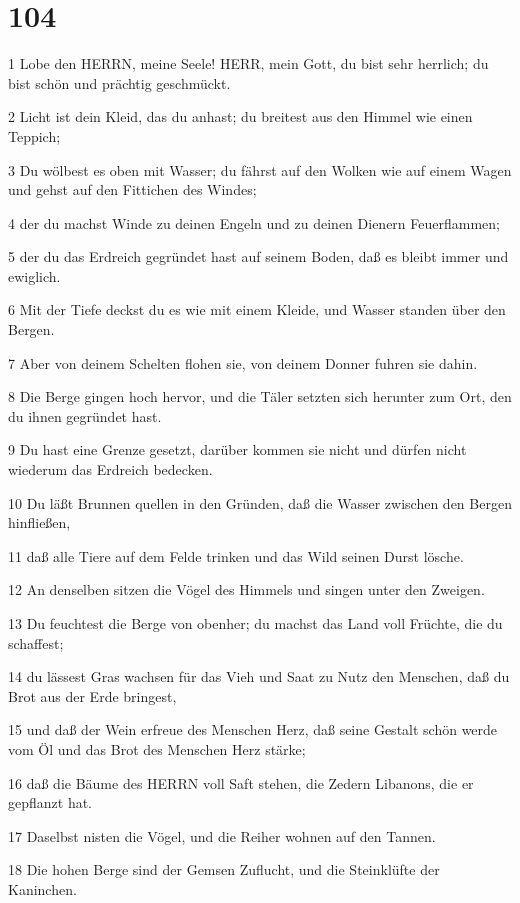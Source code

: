 \chapter{104}

\par 1 Lobe den HERRN, meine Seele! HERR, mein Gott, du bist sehr herrlich; du bist schön und prächtig geschmückt.
\par 2 Licht ist dein Kleid, das du anhast; du breitest aus den Himmel wie einen Teppich;
\par 3 Du wölbest es oben mit Wasser; du fährst auf den Wolken wie auf einem Wagen und gehst auf den Fittichen des Windes;
\par 4 der du machst Winde zu deinen Engeln und zu deinen Dienern Feuerflammen;
\par 5 der du das Erdreich gegründet hast auf seinem Boden, daß es bleibt immer und ewiglich.
\par 6 Mit der Tiefe deckst du es wie mit einem Kleide, und Wasser standen über den Bergen.
\par 7 Aber von deinem Schelten flohen sie, von deinem Donner fuhren sie dahin.
\par 8 Die Berge gingen hoch hervor, und die Täler setzten sich herunter zum Ort, den du ihnen gegründet hast.
\par 9 Du hast eine Grenze gesetzt, darüber kommen sie nicht und dürfen nicht wiederum das Erdreich bedecken.
\par 10 Du läßt Brunnen quellen in den Gründen, daß die Wasser zwischen den Bergen hinfließen,
\par 11 daß alle Tiere auf dem Felde trinken und das Wild seinen Durst lösche.
\par 12 An denselben sitzen die Vögel des Himmels und singen unter den Zweigen.
\par 13 Du feuchtest die Berge von obenher; du machst das Land voll Früchte, die du schaffest;
\par 14 du lässest Gras wachsen für das Vieh und Saat zu Nutz den Menschen, daß du Brot aus der Erde bringest,
\par 15 und daß der Wein erfreue des Menschen Herz, daß seine Gestalt schön werde vom Öl und das Brot des Menschen Herz stärke;
\par 16 daß die Bäume des HERRN voll Saft stehen, die Zedern Libanons, die er gepflanzt hat.
\par 17 Daselbst nisten die Vögel, und die Reiher wohnen auf den Tannen.
\par 18 Die hohen Berge sind der Gemsen Zuflucht, und die Steinklüfte der Kaninchen.

